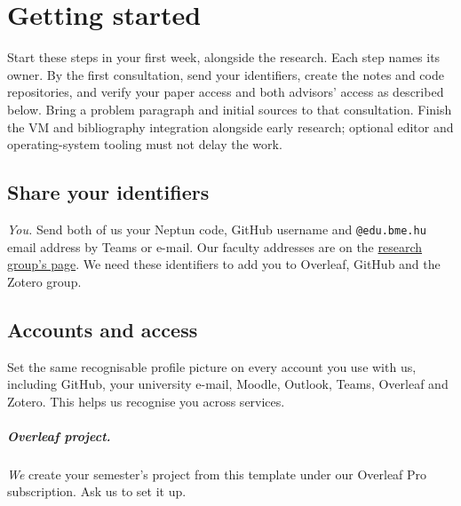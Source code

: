 \chapter{Getting started}\label{app:start}
Start these steps in your first week, alongside the research. Each step names its owner. By the first consultation, send your identifiers, create the notes and code repositories, and verify your paper access and both advisors' access as described below. Bring a problem paragraph and initial sources to that consultation. Finish the VM and bibliography integration alongside early research; optional editor and operating-system tooling must not delay the work.

\section{Share your identifiers}\label{app:start:ids}
\emph{You.} Send both of us your Neptun code, GitHub username and \texttt{@edu.bme.hu} email address by Teams or e-mail. Our faculty addresses are on the \href{https://ftsrg.mit.bme.hu/en/about/}{research group's page}. We need these identifiers to add you to Overleaf, GitHub and the Zotero group.

\section{Accounts and access}\label{app:start:access}
Set the same recognisable profile picture on every account you use with us, including GitHub, your university e-mail, Moodle, Outlook, Teams, Overleaf and Zotero. This helps us recognise you across services.

\paragraph{Overleaf project.} \emph{We} create your semester's project from this template under our Overleaf Pro subscription. Ask us to set it up.

